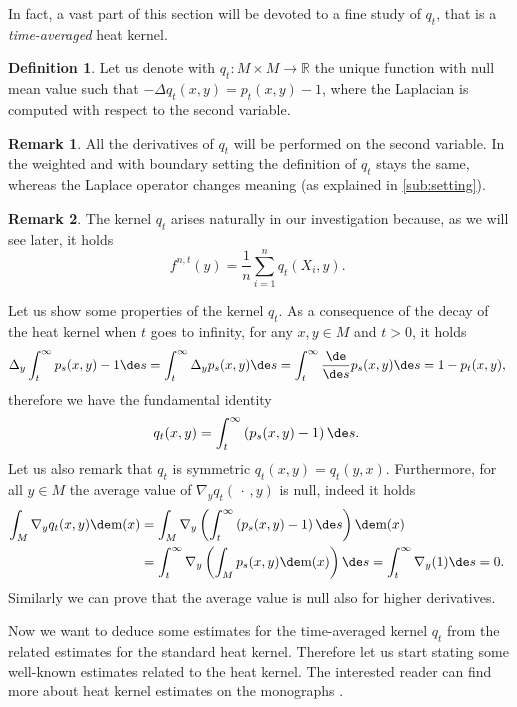 \documentclass[10pt]{amsart}
\theoremstyle{plain}
\theoremstyle{definition}
\newtheorem{remark}[remark]{Remark}
\newtheorem{definition}[definition]{Definition}
\numberwithin{equation}{section}
\newcommand{\RR}{\ensuremath{\mathbb R}}
\newcommand{\emptyparam}{\ensuremath{\,\cdot\,}}
\newcommand{\lapl}{\ensuremath{\Delta}}
\renewcommand{\comma}{\ensuremath{\text{, }}}
\newcommand{\comma}{\ensuremath{\text{, }}}
\newcommand{\fullstop}{\ensuremath{\text{. }}}
\newcommand{\m}{\ensuremath{\mathrm m}}
\begin{document}
In fact, a vast part of this section will be devoted to a fine study of $q_t$, that is
a \emph{time-averaged} heat kernel.
\begin{definition}
Let us denote with $q_t:M\times M\to\RR$ the unique function with null mean value such that
$-\lapl q_t(x,y) = p_t(x,y)-1$, where the Laplacian is computed with respect to the second variable.
\end{definition}

\begin{remark}
All the derivatives of $q_t$ will be performed on the second variable.
In the weighted and with boundary setting the definition of $q_t$ stays the same,
whereas the Laplace operator changes meaning (as explained in \cref{sub:setting}).
\end{remark}
\begin{remark}
The kernel $q_t$ arises naturally in our investigation because, as we will see later, it holds
\begin{equation*}
f^{n,t}(y) = \frac1n\sum_{i=1}^n q_t(X_i, y)\fullstop
\end{equation*}
\end{remark}

Let us show some properties of the kernel $q_t$.
As a consequence of the decay of the heat kernel when $t$ goes to infinity, for any $x,y\in M$ and $t>0$, it holds
\begin{equation*}
\lapl_y \int_t^{\infty} p_s(x,y)-1\de s = \int_t^{\infty} \lapl_y p_s(x,y)\de s
= \int_t^{\infty} \frac{\de}{\de s} p_s(x,y)\de s = 1 - p_t(x,y) \comma
\end{equation*}
therefore we have the fundamental identity
\begin{equation}\label{eq:q_expr}
q_t(x,y) = \int_t^{\infty}\left(p_s(x,y)-1\right)\de s \fullstop
\end{equation}
Let us also remark that $q_t$ is symmetric $q_t(x,y) = q_t(y, x)$.
Furthermore, for all $y\in M$ the average value of $\nabla_y q_t(\emptyparam, y)$ is null, indeed it holds
\begin{align*}
\int_M \nabla_y q_t(x, y)\de\m(x)
&= \int_M \nabla_y\left(\int_t^{\infty}\left(p_s(x,y)-1\right)\de s\right)\de\m(x) \\
&= \int_t^{\infty}\nabla_y\left(\int_M p_s(x,y)\de\m(x)\right)\de s
= \int_t^{\infty}\nabla_y(1) \de s = 0 \fullstop
\end{align*}
Similarly we can prove that the average value is null also for higher derivatives.

Now we want to deduce some estimates for the time-averaged kernel $q_t$ from the related estimates for
the standard heat kernel.
Therefore let us start stating some well-known estimates related to the heat kernel. The interested reader
can find more about heat kernel estimates on the monographs \cite{saloff2010,grigor1999}.
\end{document}
